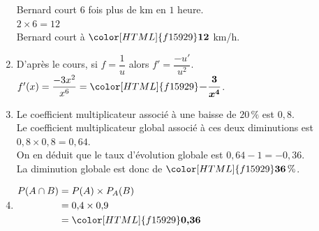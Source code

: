 \documentclass[a4paper,11pt,landscape,exos]{nsi} %
\begin{document}
\begin{multicols}{2}
\begin{enumerate}[]
    Bernard court $6$ fois plus de km en $1$ heure.\\
   $2\times 6=12$\\
   Bernard court à ${\color[HTML]{f15929}\boldsymbol{12}}$ km/h.
\item D'après le cours, si $f=\dfrac{1}{u}$ alors $f'=\dfrac{-u'}{u^2}$.\\
    $f'(x)=\dfrac{-3x^{2}}{x^{6}}={\color[HTML]{f15929}\boldsymbol{-\dfrac{3}{x^{4}}}}$.
\item  Le coefficient multiplicateur  associé à une baisse de $20\,\%$ est $0{,}8$.\\
    Le coefficient multiplicateur global associé à ces deux diminutions est $0{,}8\times 0{,}8= 0{,}64$.\\
    On en déduit que le taux d'évolution globale est $0{,}64-1=-0{,}36$.\\
    La diminution globale est donc de ${\color[HTML]{f15929}\boldsymbol{36}} \,\%$.
\item 
              $\begin{aligned}
              P(A\cap B)&=P(A) \times P_A(B)\\
              &=0{,}4\times 0{,}9\\
              &={\color[HTML]{f15929}\boldsymbol{0{,}36}}
              \end{aligned}$              
\end{enumerate}
\end{multicols}
\end{document}

